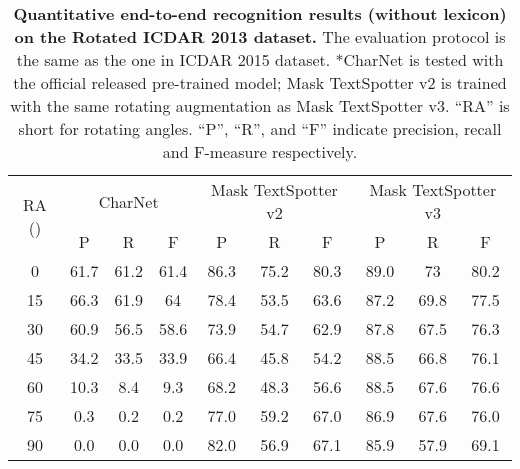 \documentclass[runningheads]{llncs}
\begin{document}
\begin{table*}[ht]
    \setlength{\tabcolsep}{8.0pt}
    \centering
    \caption{\textbf{Quantitative end-to-end recognition results (without lexicon) on the Rotated ICDAR 2013 dataset.} The evaluation protocol is the same as the one in ICDAR 2015 dataset. *CharNet is tested with the official released pre-trained model; Mask TextSpotter v2 is trained with the same rotating augmentation as Mask TextSpotter v3. ``RA'' is short for rotating angles. ``P'', ``R'', and ``F'' indicate precision, recall and F-measure respectively.}
    \label{tab:rotated_ic13_rec}
    \begin{tabularx}{1.0\textwidth}{c*{9}c}
    \toprule
    \multirow{2}{*}{RA ()} & \multicolumn{3}{c}{CharNet} & \multicolumn{3}{c}{Mask TextSpotter v2} & \multicolumn{3}{c}{Mask TextSpotter v3} \\ \cline{2-10} 
                                     & P        & R       & F       & P            & R           & F           & P          & R          & F          \\ 
    \midrule
    0                                & 61.7     & 61.2    & 61.4    & 86.3         & 75.2        & 80.3        & 89.0         & 73         & 80.2       \\ 
    15                               & 66.3     & 61.9    & 64      & 78.4         & 53.5        & 63.6        & 87.2       & 69.8       & 77.5       \\ 
    30                               & 60.9     & 56.5    & 58.6    & 73.9         & 54.7        & 62.9        & 87.8       & 67.5       & 76.3       \\ 
    45                               & 34.2     & 33.5    & 33.9    & 66.4         & 45.8        & 54.2        & 88.5       & 66.8       & 76.1       \\ 
    60                               & 10.3     & 8.4     & 9.3     & 68.2         & 48.3        & 56.6        & 88.5       & 67.6       & 76.6       \\ 
    75                               & 0.3      & 0.2     & 0.2     & 77.0         & 59.2        & 67.0        & 86.9       & 67.6       & 76.0       \\ 
    90                               & 0.0      & 0.0     & 0.0     & 82.0         & 56.9        & 67.1        & 85.9       & 57.9       & 69.1       \\ 
    \bottomrule  
    \end{tabularx}
\end{table*}
\end{document}
